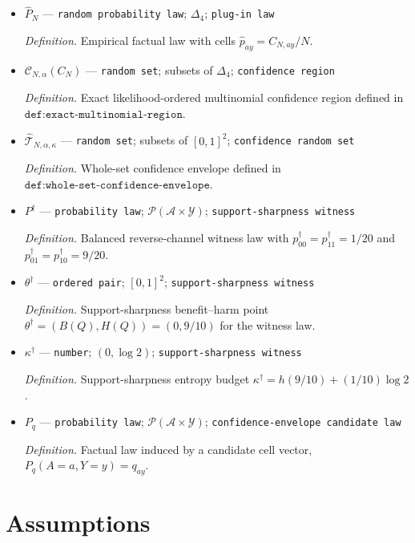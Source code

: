 \documentclass{article}
\begin{document}
\begin{itemize}
  \item \(\widehat P_N\) --- \texttt{random probability law}; \(\Delta_4\); \texttt{plug-\allowbreak{}in law}
  \par\smallskip\noindent\emph{Definition.} Empirical factual law with cells \(\widehat p_{ay}=C_{N,ay}/N\).
  \item \(\mathcal C_{N,\alpha}(C_N)\) --- \texttt{random set}; subsets of \(\Delta_4\); \texttt{confidence region}
  \par\smallskip\noindent\emph{Definition.} Exact likelihood-ordered multinomial confidence region defined in \(\texttt{def:exact-multinomial-region}\).
  \item \(\widehat{\mathcal T}_{N,\alpha,\kappa}\) --- \texttt{random set}; subsets of \([0,1]^2\); \texttt{confidence random set}
  \par\smallskip\noindent\emph{Definition.} Whole-set confidence envelope defined in \(\texttt{def:whole-set-confidence-envelope}\).
  \item \(P^\dagger\) --- \texttt{probability law}; \(\mathcal P(\mathcal A\times\mathcal Y)\); \texttt{support-\allowbreak{}sharpness witness}
  \par\smallskip\noindent\emph{Definition.} Balanced reverse-channel witness law with \(p^\dagger_{00}=p^\dagger_{11}=1/20\) and \(p^\dagger_{01}=p^\dagger_{10}=9/20\).
  \item \(\theta^\dagger\) --- \texttt{ordered pair}; \([0,1]^2\); \texttt{support-\allowbreak{}sharpness witness}
  \par\smallskip\noindent\emph{Definition.} Support-sharpness benefit--harm point \(\theta^\dagger=(B(Q),H(Q))=(0,9/10)\) for the witness law.
  \item \(\kappa^\dagger\) --- \texttt{number}; \((0,\log2)\); \texttt{support-\allowbreak{}sharpness witness}
  \par\smallskip\noindent\emph{Definition.} Support-sharpness entropy budget \(\kappa^\dagger=h(9/10)+(1/10)\log2\).
  \item \(P_q\) --- \texttt{probability law}; \(\mathcal P(\mathcal A\times\mathcal Y)\); \texttt{confidence-\allowbreak{}envelope candidate law}
  \par\smallskip\noindent\emph{Definition.} Factual law induced by a candidate cell vector, \(P_q(A=a,Y=y)=q_{ay}\).
\end{itemize}

\section{Assumptions}
\end{document}

